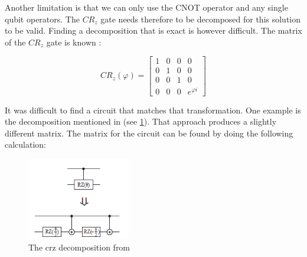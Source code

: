 \documentclass[12pt,a4paper]{article}
\begin{document}
Another limitation is that we can only use the CNOT operator and any single qubit operators. The \(CR_z\) gate needs therefore to be decomposed for this solution to be valid. Finding a decomposition that is exact is however difficult. The matrix of the \(CR_z\) gate is known \cite[p. 293]{sutor_dancing_2019}:

\[
    CR_z(\varphi) = 
    \begin{bmatrix}
        1 & 0 & 0 & 0 \\
        0 & 1 & 0 & 0 \\
        0 & 0 & 1 & 0 \\
        0 & 0 & 0 & e^{\varphi i}
    \end{bmatrix}
\]

It was difficult to find a circuit that matches that transformation. One example is the decomposition mentioned in \cite{liu_analysis_2024} (see \ref{fig:crz_decomp}). That approach produces a slightly different matrix. The matrix for the circuit can be found by doing the following calculation:

\begin{figure}[t] 
    \centering \includegraphics[width=0.4\textwidth]{Figures/crz_decomposition.png} 
    \caption{The crz decomposition from \cite{liu_analysis_2024}}
    \label{fig:crz_decomp} 
\end{figure}
\end{document}
